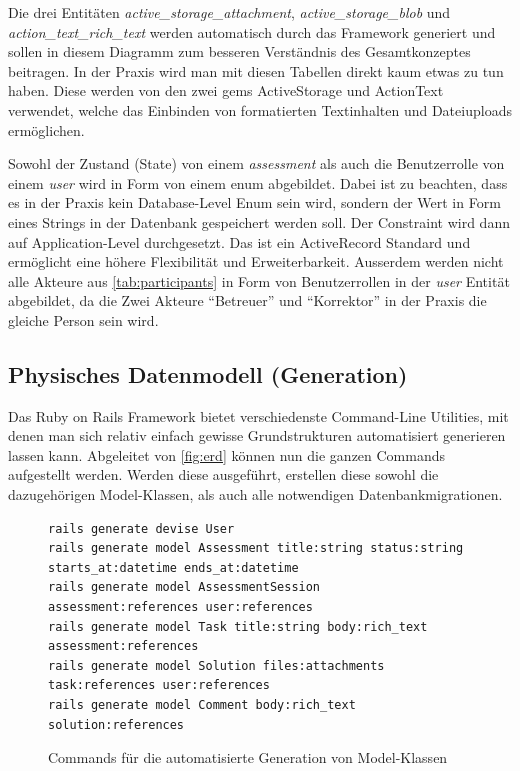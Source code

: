 \newpage

Die drei Entitäten \emph{active\_storage\_attachment}, \emph{active\_storage\_blob} und \emph{action\_text\_rich\_text} werden automatisch durch das
Framework generiert und sollen in diesem Diagramm zum besseren Verständnis des Gesamtkonzeptes beitragen. In der Praxis wird man mit diesen Tabellen direkt kaum etwas zu tun haben.
Diese werden von den zwei gems ActiveStorage und ActionText verwendet, welche das Einbinden von formatierten Textinhalten und Dateiuploads ermöglichen.

Sowohl der Zustand (State) von einem \emph{assessment} als auch die Benutzerrolle von einem \emph{user} wird in Form von einem \gls{enum} abgebildet. Dabei ist zu beachten, dass es in der Praxis kein Database-Level Enum sein wird,
sondern der Wert in Form eines Strings in der Datenbank gespeichert werden soll. Der Constraint wird dann auf Application-Level durchgesetzt. Das ist ein ActiveRecord Standard und ermöglicht eine höhere Flexibilität und Erweiterbarkeit.
Ausserdem werden nicht alle Akteure aus \ref{tab:participants} in Form von Benutzerrollen in der \emph{user} Entität abgebildet, da die Zwei Akteure \enquote{Betreuer} und \enquote{Korrektor} in der Praxis die gleiche Person sein wird.

\subsection{Physisches Datenmodell (Generation)}

Das Ruby on Rails Framework bietet verschiedenste Command-Line Utilities, mit denen man sich relativ einfach gewisse
Grundstrukturen automatisiert generieren lassen kann. Abgeleitet von \ref{fig:erd} können nun die ganzen Commands aufgestellt werden.
Werden diese ausgeführt, erstellen diese sowohl die dazugehörigen Model-Klassen, als auch alle notwendigen Datenbankmigrationen.

\begin{figure}[H]
\begin{codebox}
\begin{verbatim}
rails generate devise User
rails generate model Assessment title:string status:string starts_at:datetime ends_at:datetime
rails generate model AssessmentSession assessment:references user:references
rails generate model Task title:string body:rich_text assessment:references
rails generate model Solution files:attachments task:references user:references
rails generate model Comment body:rich_text solution:references
\end{verbatim}
\end{codebox}
\caption{\label{fig:generate-models}Commands für die automatisierte Generation von Model-Klassen}
\end{figure}


